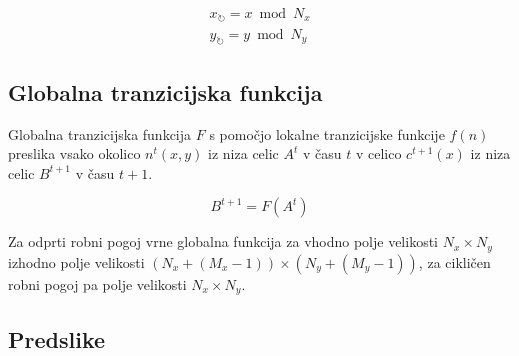\documentclass[12pt,a4paper,openany,twoside]{book}
\begin{document}
\begin{equation}
\substack{
x_{\circlearrowright} = x \bmod N_x \\
y_{\circlearrowright} = y \bmod N_y
}
\end{equation}

\subsection{Globalna tranzicijska funkcija}

Globalna tranzicijska funkcija \(F\) s pomočjo lokalne tranzicijske funkcije \(f(n)\)
preslika vsako okolico \(n^t(x,y)\) iz niza celic \(A^t\) v času \(t\)
v celico \(c^{t+1}(x)\) iz niza celic \(B^{t+1}\) v času \(t+1\).

\begin{equation}
B^{t+1} = F (A^t)
\end{equation}

Za odprti robni pogoj vrne globalna funkcija za vhodno polje velikosti \(N_x \times N_y\)
izhodno polje velikosti \((N_x+(M_x-1)) \times (N_y+(M_y-1))\),
za cikličen robni pogoj pa polje velikosti \(N_x \times N_y\).

\subsection{Predslike}
\end{document}
